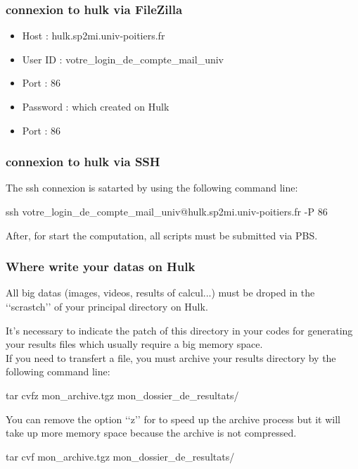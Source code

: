 \documentclass[12pt]{article}
\begin{document}
\subsubsection*{connexion to hulk via FileZilla}

\begin{itemize}
	\item	 Host : hulk.sp2mi.univ-poitiers.fr
	\item	User ID : votre\_login\_de\_compte\_mail\_univ 
	\item	Port : 86
	\item	Password : which created on Hulk 
	\item	Port : 86
\end{itemize}

\subsubsection*{connexion to hulk via SSH}
The ssh connexion is satarted by using the following command line:
  
ssh votre\_login\_de\_compte\_mail\_univ@hulk.sp2mi.univ-poitiers.fr -P 86

After, for start the computation, all scripts must be submitted via PBS.

\subsubsection*{Where write your datas on Hulk}

All big datas (images, videos, results of calcul...) must be droped in the \lq\lq{}scrastch\rq\rq{} of your principal directory on Hulk.

It\rq{}s necessary to indicate the  patch of this directory in your codes for generating your results files which usually require a big memory space.\\ 

If you need to transfert a file, you must archive your results directory  by the following command line:

tar cvfz mon\_archive.tgz mon\_dossier\_de\_resultats/

You can remove the option \lq\lq{}z\rq\rq{} for to speed up the archive process but it will take up more memory space because the archive is not compressed.

tar cvf mon\_archive.tgz mon\_dossier\_de\_resultats/



 
\end{document}
